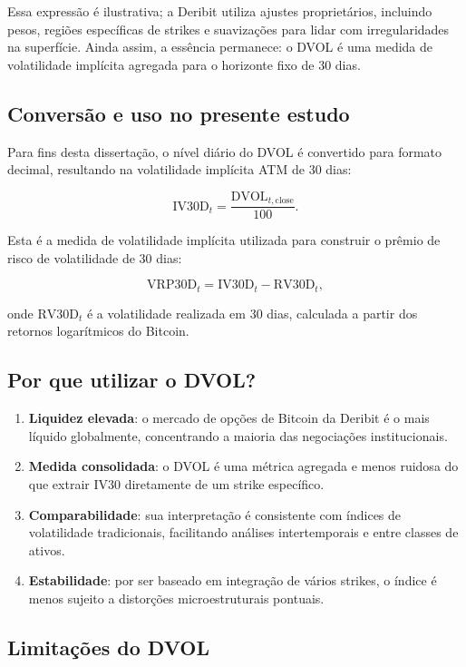 Essa expressão é ilustrativa; a Deribit utiliza ajustes proprietários, incluindo pesos,
regiões específicas de strikes e suavizações para lidar com irregularidades na
superfície. Ainda assim, a essência permanece: o DVOL é uma medida de volatilidade
implícita agregada para o horizonte fixo de 30 dias.

\subsection{Conversão e uso no presente estudo}

Para fins desta dissertação, o nível diário do DVOL é convertido para formato
decimal, resultando na volatilidade implícita ATM de 30 dias:

\[
\text{IV30D}_t = \frac{\text{DVOL}_{t,\text{close}}}{100}.
\]

Esta é a medida de volatilidade implícita utilizada para construir o prêmio de
risco de volatilidade de 30 dias:

\[
\text{VRP30D}_t = \text{IV30D}_t - \text{RV30D}_t,
\]

onde $\text{RV30D}_t$ é a volatilidade realizada em 30 dias, calculada a partir dos
retornos logarítmicos do Bitcoin.

\subsection{Por que utilizar o DVOL?}

\begin{enumerate}
    \item \textbf{Liquidez elevada}: o mercado de opções de Bitcoin da Deribit é o mais
    líquido globalmente, concentrando a maioria das negociações institucionais.
    \item \textbf{Medida consolidada}: o DVOL é uma métrica agregada e menos ruidosa
    do que extrair IV30 diretamente de um strike específico.
    \item \textbf{Comparabilidade}: sua interpretação é consistente com índices de
    volatilidade tradicionais, facilitando análises intertemporais e entre classes
    de ativos.
    \item \textbf{Estabilidade}: por ser baseado em integração de vários strikes, o
    índice é menos sujeito a distorções microestruturais pontuais.
\end{enumerate}

\subsection{Limitações do DVOL}

